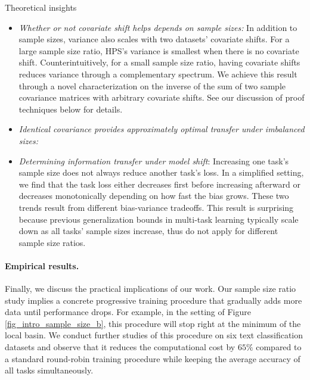Theoretical insights
\begin{itemize}
    \item \textit{Whether or not covariate shift helps depends on sample sizes:} In addition to sample sizes, variance also scales with two datasets' covariate shifts. For a large sample size ratio, HPS's  variance is smallest when there is no covariate shift. Counterintuitively, for a small sample size ratio, having covariate shifts reduces variance through a complementary spectrum. We achieve this result through a novel characterization on the inverse of the sum of two sample covariance matrices with arbitrary covariate shifts. See our discussion of proof techniques below for details.
    \item \textit{Identical covariance provides approximately optimal transfer under imbalanced sizes:}
    \item \textit{Determining information transfer under model shift}: Increasing one task's sample size does not always reduce another task's loss. In a simplified setting, we find that the task loss either decreases first before increasing afterward or decreases monotonically depending on how fast the bias grows. These two trends result from different bias-variance tradeoffs. This result is surprising because previous generalization bounds in multi-task learning typically scale down as all tasks' sample sizes increase, thus do not apply for different sample size ratios.
\end{itemize}

\paragraph{Empirical results.}
Finally, we discuss the practical implications of our work.
Our sample size ratio study implies a concrete progressive training procedure that gradually adds more data until performance drops.
For example, in the setting of Figure \ref{fig_intro_sample_size_b}, this procedure will stop right at the minimum of the local basin.
We conduct further studies of this procedure on six text classification datasets and observe that it reduces the computational cost by $65\%$ compared to a standard round-robin training procedure while keeping the average accuracy of all tasks simultaneously.


